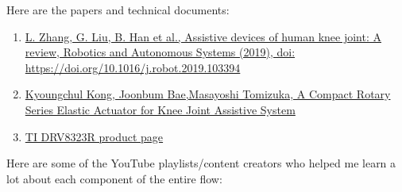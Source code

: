 \documentclass[a4paper]{article}
\begin{document}
		Here are the papers and technical documents:
		\begin{enumerate}
			\item\href{https://doi.org/10.1016/j.robot.2019.103394}{L. Zhang, G. Liu, B. Han et al., Assistive devices of human knee joint: A
				review, Robotics and Autonomous Systems (2019), doi:
				https://doi.org/10.1016/j.robot.2019.103394}
			\item \href{https://ieeexplore.ieee.org/document/5509227}{Kyoungchul Kong, Joonbum Bae,Masayoshi Tomizuka, A Compact Rotary Series Elastic Actuator for Knee Joint Assistive System}
			\item \href{https://www.ti.com/product/DRV8323R#tech-docs}{TI DRV8323R product page}
		\end{enumerate}

		Here are some of the YouTube playlists/content creators who helped me learn a lot about each component of the entire flow:
\end{document}
